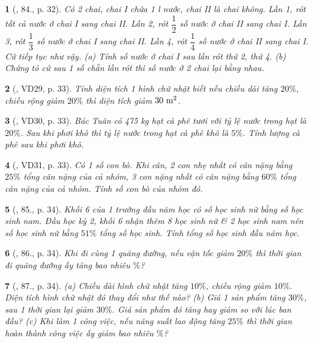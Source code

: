 \documentclass{article}
\newtheorem{baitoan}{}
\begin{document}
\begin{baitoan}[\cite{Binh_Toan_6_tap_2}, 84., p. 32]
	Có 2 chai, chai I chứa {\rm1 l} nước, chai II là chai không. Lần 1, rót tất cả nước ở chai I sang chai II. Lần 2, rót $\dfrac{1}{2}$ số nước ở chai II sang chai I. Lần 3, rót $\dfrac{1}{3}$ số nước ở chai I sang chai II. Lần 4, rót $\dfrac{1}{4}$ số nước ở chai II sang chai I. Cứ tiếp tục như vậy. (a) Tính số nước ở chai I sau lần rót thứ 2, thứ 4. (b) Chứng tỏ cứ sau 1 số chẵn lần rót thì số nước ở 2 chai lại bằng nhau.
\end{baitoan}

\begin{baitoan}[\cite{Binh_Toan_6_tap_2}, VD29, p. 33]
	Tính diện tích 1 hình chữ nhật biết nếu chiều dài tăng $20\%$, chiều rộng giảm $20\%$ thì diện tích giảm $\rm30\ m^2$.
\end{baitoan}

\begin{baitoan}[\cite{Binh_Toan_6_tap_2}, VD30, p. 33]
	Bác Tuân có {\rm475 kg} hạt cà phê tươi với tỷ lệ nước trong hạt là $20\%$. Sau khi phơi khô thì tỷ lệ nước trong hạt cà phê khô là $5\%$. Tính lượng cà phê sau khi phơi khô.
\end{baitoan}

\begin{baitoan}[\cite{Binh_Toan_6_tap_2}, VD31, p. 33]
	Có 1 số con bò. Khi cân, 2 con nhẹ nhất có cân nặng bằng $25\%$ tổng cân nặng của cả nhóm, 3 con nặng nhất có cân nặng bằng $60\%$ tổng cân nặng của cả nhóm. Tính số con bò của nhóm đó.
\end{baitoan}

\begin{baitoan}[\cite{Binh_Toan_6_tap_2}, 85., p. 34]
	Khối 6 của 1 trường đầu năm học có số học sinh nữ bằng số học sinh nam. Đầu học kỳ 2, khối 6 nhận thêm 8 học sinh nữ \& 2 học sinh nam nên số học sinh nữ bằng $51\%$ tổng số học sinh. Tính tổng số học sinh đầu năm học.
\end{baitoan}

\begin{baitoan}[\cite{Binh_Toan_6_tap_2}, 86., p. 34]
	Khi đi cùng 1 quãng đường, nếu vận tốc giảm $20\%$ thì thời gian đi quãng đường ấy tăng bao nhiêu $\%$?
\end{baitoan}

\begin{baitoan}[\cite{Binh_Toan_6_tap_2}, 87., p. 34]
	(a) Chiều dài hình chữ nhật tăng $10\%$, chiều rộng giảm $10\%$. Diện tích hình chữ nhật đó thay đổi như thế nào? (b) Giá 1 sản phẩm tăng $30\%$, sau 1 thời gian lại giảm $30\%$. Giá sản phẩm đó tăng hay giảm so với lúc ban đầu? (c) Khi làm 1 công việc, nếu năng suất lao động tăng $25\%$ thì thời gian hoàn thành công việc ấy giảm bao nhiêu $\%$?
\end{baitoan}
\end{document}
